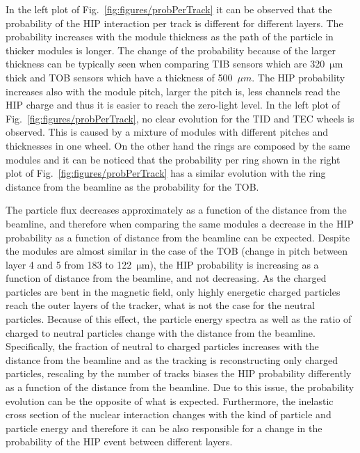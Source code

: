 In the left plot of Fig.~\ref{fig:figures/probPerTrack} it can be observed that the probability of the HIP interaction per track is different for different layers. The probability increases with the module thickness as the path of the particle in thicker modules is longer. The change of the probability because of the larger thickness can be typically seen when comparing TIB sensors which are 320~$\mathrm{\mu m}$ thick and TOB sensors which have a thickness of 500~$\mu m$. The HIP probability increases also with the module pitch, larger the pitch is, less channels read the HIP charge and thus it is easier to reach the zero-light level. In the left plot of Fig.~\ref{fig:figures/probPerTrack}, no clear evolution for the TID and TEC wheels is observed. This is caused by a mixture of modules with different pitches and thicknesses in one wheel. On the other hand the rings are composed by the same modules and it can be noticed that the probability per ring shown in the right plot of Fig.~\ref{fig:figures/probPerTrack} has a similar evolution with the ring distance from the beamline as the probability for the TOB. 

The particle flux decreases approximately as a function of the distance from the beamline, and therefore when comparing the same modules a decrease in the HIP probability as a function of distance from the beamline can be expected. Despite the modules are almost similar in the case of the TOB (change in pitch between layer 4 and 5 from 183 to 122~$\mathrm{\mu m}$), the HIP probability is increasing as a function of distance from the beamline, and not decreasing. As the charged particles are bent in the magnetic field, only highly energetic charged particles reach the outer layers of the tracker, what is not the case for the neutral particles. Because of this effect, the particle energy spectra as well as the ratio of charged to neutral particles change with the distance from the beamline. Specifically, the fraction of neutral to charged particles increases with the distance from the beamline and as the tracking is reconstructing only charged particles, rescaling by the number of tracks biases the HIP probability differently as a function of the distance from the beamline. Due to this issue, the probability evolution can be the opposite of what is expected. Furthermore, the inelastic cross section of the nuclear interaction changes with the kind of particle and particle energy and therefore it can be also responsible for a change in the probability of the HIP event between different layers.  


